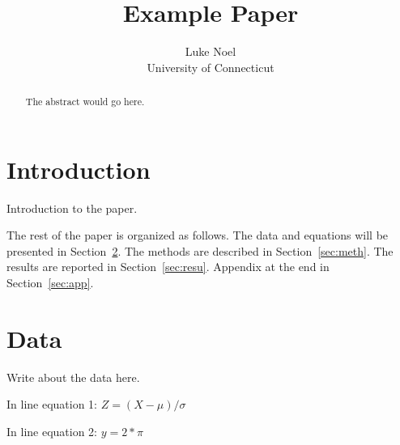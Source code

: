 \documentclass[12pt]{article}
\title{Example Paper}
\author{Luke Noel\\
  University of Connecticut
}
\begin{document}
\maketitle

\begin{abstract}
The abstract would go here. 
\end{abstract}

\section{Introduction}
\label{sec:intro}
Introduction to the paper.

The rest of the paper is organized as follows.
The data and equations will be presented in Section~\ref{sec:data}.
The methods are described in Section~\ref{sec:meth}.
The results are reported in Section~\ref{sec:resu}.
Appendix at the end in Section~\ref{sec:app}.

\section{Data}
\label{sec:data}

Write about the data here.

In line equation 1: $Z = (X - \mu)/\sigma$

In line equation 2: $y = 2*\pi$
\end{document}
